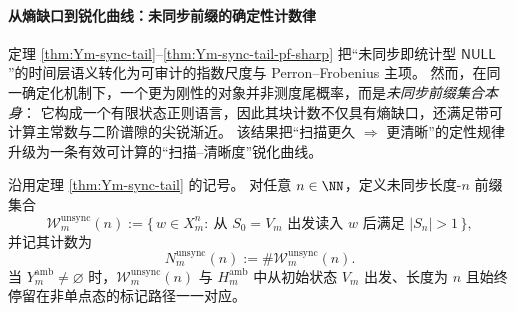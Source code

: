 \paragraph{从熵缺口到锐化曲线：未同步前缀的确定性计数律}
定理 \ref{thm:Ym-sync-tail}--\ref{thm:Ym-sync-tail-pf-sharp} 把“未同步即统计型 \(\mathsf{NULL}\)”的时间层语义转化为可审计的指数尺度与 Perron--Frobenius 主项。
然而，在同一确定化机制下，一个更为刚性的对象并非测度尾概率，而是\emph{未同步前缀集合本身}：
它构成一个有限状态正则语言，因此其块计数不仅具有熵缺口，还满足带可计算主常数与二阶谱隙的尖锐渐近。
该结果把“扫描更久 \(\Rightarrow\) 更清晰”的定性规律升级为一条有效可计算的“扫描--清晰度”锐化曲线。

\begin{definition}[未同步前缀集合与计数]\label{def:Ym-unsync-prefix-count}
沿用定理 \ref{thm:Ym-sync-tail} 的记号。
对任意 \(n\in\NN\)，定义未同步长度-\(n\) 前缀集合
\[
\mathcal{W}_{m}^{\mathrm{unsync}}(n)
:=\{\,w\in X_m^n:\ \text{从 }S_0=V_m\text{ 出发读入 }w\text{ 后满足 }|S_n|>1\,\},
\]
并记其计数为
\[
N_m^{\mathrm{unsync}}(n):=\#\mathcal{W}_{m}^{\mathrm{unsync}}(n).
\]
当 \(Y_m^{\mathrm{amb}}\neq\varnothing\) 时，\(\mathcal{W}_{m}^{\mathrm{unsync}}(n)\) 与 \(H_m^{\mathrm{amb}}\) 中从初始状态 \(V_m\) 出发、长度为 \(n\) 且始终停留在非单点态的标记路径一一对应。
\end{definition}

